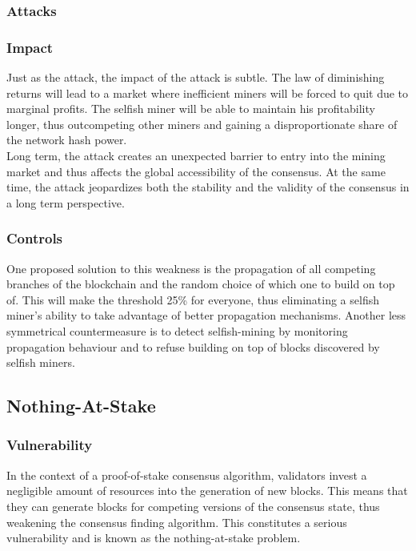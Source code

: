 \documentclass[11pt,a4paper,draft]{article}
\begin{document}
\subsubsection{Attacks}

\subsubsection{Impact}

Just as the attack, the impact of the attack is subtle. The law of diminishing returns will lead to a market where inefficient miners will be forced to quit due to marginal profits. The selfish miner will be able to maintain his profitability longer, thus outcompeting other miners and gaining a disproportionate share of the network hash power.\\

Long term, the attack creates an unexpected barrier to entry into the mining market and thus affects the global accessibility of the consensus. At the same time, the attack jeopardizes both the stability and the validity of the consensus in a long term perspective.\\

\subsubsection{Controls}

One proposed solution to this weakness is the propagation of all competing branches of the blockchain and the random choice of which one to build on top of. This will make the threshold 25\% for everyone, thus eliminating a selfish miner's ability to take advantage of better propagation mechanisms. Another less symmetrical countermeasure is to detect selfish-mining by monitoring propagation behaviour and to refuse building on top of blocks discovered by selfish miners.\\

\subsection{Nothing-At-Stake}

\subsubsection{Vulnerability}

In the context of a proof-of-stake consensus algorithm, validators invest a negligible amount of resources into the generation of new blocks. This means that they can generate blocks for competing versions of the consensus state, thus weakening the consensus finding algorithm. This constitutes a serious vulnerability and is known as the nothing-at-stake problem.\\
\end{document}
